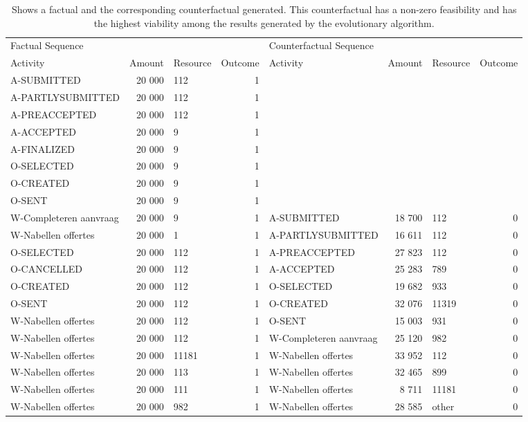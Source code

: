 \begin{table}
\caption{Shows a factual and the corresponding counterfactual generated. This counterfactual has a non-zero feasibility and has the highest viability among the results generated by the evolutionary algorithm.}
\label{tbl:example-cf-evo-feasibility}
\begin{tabular}{lrlrlrlr}
\toprule
\multicolumn{4}{l}{Factual Sequence} & \multicolumn{4}{l}{Counterfactual Sequence} \\
Activity & Amount & Resource & Outcome & Activity & Amount & Resource & Outcome \\
\midrule
A-SUBMITTED & 20 000 & 112 & 1 &  &  &  &  \\
A-PARTLYSUBMITTED & 20 000 & 112 & 1 &  &  &  &  \\
A-PREACCEPTED & 20 000 & 112 & 1 &  &  &  &  \\
A-ACCEPTED & 20 000 & 9 & 1 &  &  &  &  \\
A-FINALIZED & 20 000 & 9 & 1 &  &  &  &  \\
O-SELECTED & 20 000 & 9 & 1 &  &  &  &  \\
O-CREATED & 20 000 & 9 & 1 &  &  &  &  \\
O-SENT & 20 000 & 9 & 1 &  &  &  &  \\
W-Completeren aanvraag & 20 000 & 9 & 1 & A-SUBMITTED & 18 700 & 112 & 0 \\
W-Nabellen offertes & 20 000 & 1 & 1 & A-PARTLYSUBMITTED & 16 611 & 112 & 0 \\
O-SELECTED & 20 000 & 112 & 1 & A-PREACCEPTED & 27 823 & 112 & 0 \\
O-CANCELLED & 20 000 & 112 & 1 & A-ACCEPTED & 25 283 & 789 & 0 \\
O-CREATED & 20 000 & 112 & 1 & O-SELECTED & 19 682 & 933 & 0 \\
O-SENT & 20 000 & 112 & 1 & O-CREATED & 32 076 & 11319 & 0 \\
W-Nabellen offertes & 20 000 & 112 & 1 & O-SENT & 15 003 & 931 & 0 \\
W-Nabellen offertes & 20 000 & 112 & 1 & W-Completeren aanvraag & 25 120 & 982 & 0 \\
W-Nabellen offertes & 20 000 & 11181 & 1 & W-Nabellen offertes & 33 952 & 112 & 0 \\
W-Nabellen offertes & 20 000 & 113 & 1 & W-Nabellen offertes & 32 465 & 899 & 0 \\
W-Nabellen offertes & 20 000 & 111 & 1 & W-Nabellen offertes & 8 711 & 11181 & 0 \\
W-Nabellen offertes & 20 000 & 982 & 1 & W-Nabellen offertes & 28 585 & other & 0 \\

\end{tabular}
\end{table}
